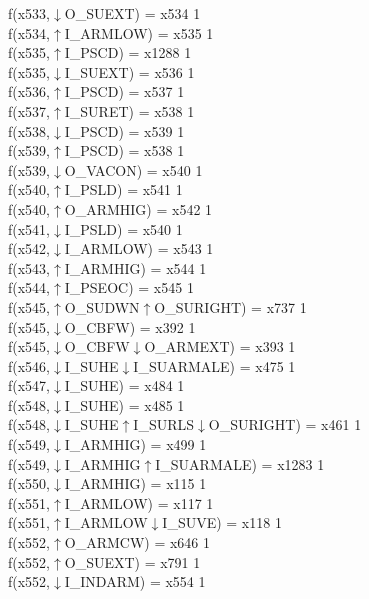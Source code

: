 f(x533,$\downarrow$O\_SUEXT) = x534 {1} \\
f(x534,$\uparrow$I\_ARMLOW) = x535 {1} \\
f(x535,$\uparrow$I\_PSCD) = x1288 {1} \\
f(x535,$\downarrow$I\_SUEXT) = x536 {1} \\
f(x536,$\uparrow$I\_PSCD) = x537 {1} \\
f(x537,$\uparrow$I\_SURET) = x538 {1} \\
f(x538,$\downarrow$I\_PSCD) = x539 {1} \\
f(x539,$\uparrow$I\_PSCD) = x538 {1} \\
f(x539,$\downarrow$O\_VACON) = x540 {1} \\
f(x540,$\uparrow$I\_PSLD) = x541 {1} \\
f(x540,$\uparrow$O\_ARMHIG) = x542 {1} \\
f(x541,$\downarrow$I\_PSLD) = x540 {1} \\
f(x542,$\downarrow$I\_ARMLOW) = x543 {1} \\
f(x543,$\uparrow$I\_ARMHIG) = x544 {1} \\
f(x544,$\uparrow$I\_PSEOC) = x545 {1} \\
f(x545,$\uparrow$O\_SUDWN$\uparrow$O\_SURIGHT) = x737 {1} \\
f(x545,$\downarrow$O\_CBFW) = x392 {1} \\
f(x545,$\downarrow$O\_CBFW$\downarrow$O\_ARMEXT) = x393 {1} \\
f(x546,$\downarrow$I\_SUHE$\downarrow$I\_SUARMALE) = x475 {1} \\
f(x547,$\downarrow$I\_SUHE) = x484 {1} \\
f(x548,$\downarrow$I\_SUHE) = x485 {1} \\
f(x548,$\downarrow$I\_SUHE$\uparrow$I\_SURLS$\downarrow$O\_SURIGHT) = x461 {1} \\
f(x549,$\downarrow$I\_ARMHIG) = x499 {1} \\
f(x549,$\downarrow$I\_ARMHIG$\uparrow$I\_SUARMALE) = x1283 {1} \\
f(x550,$\downarrow$I\_ARMHIG) = x115 {1} \\
f(x551,$\uparrow$I\_ARMLOW) = x117 {1} \\
f(x551,$\uparrow$I\_ARMLOW$\downarrow$I\_SUVE) = x118 {1} \\
f(x552,$\uparrow$O\_ARMCW) = x646 {1} \\
f(x552,$\uparrow$O\_SUEXT) = x791 {1} \\
f(x552,$\downarrow$I\_INDARM) = x554 {1} \\
